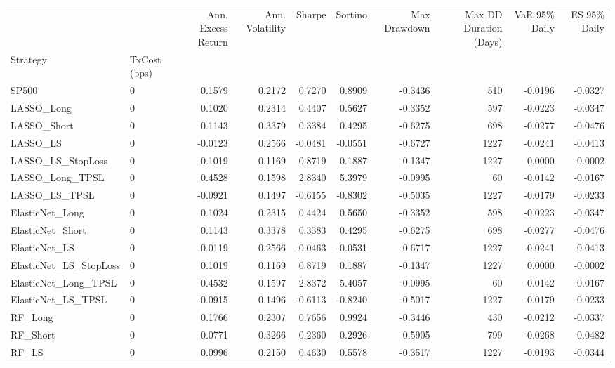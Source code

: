 \begin{tabular}{llrrrrrrrr}
\toprule
 &  & Ann. Excess Return & Ann. Volatility & Sharpe & Sortino & Max Drawdown & Max DD Duration (Days) & VaR 95\% Daily & ES 95\% Daily \\
Strategy & TxCost (bps) &  &  &  &  &  &  &  &  \\
\midrule
SP500 & 0 & 0.1579 & 0.2172 & 0.7270 & 0.8909 & -0.3436 & 510 & -0.0196 & -0.0327 \\
\cline{1-10}
LASSO\_Long & 0 & 0.1020 & 0.2314 & 0.4407 & 0.5627 & -0.3352 & 597 & -0.0223 & -0.0347 \\
\cline{1-10}
LASSO\_Short & 0 & 0.1143 & 0.3379 & 0.3384 & 0.4295 & -0.6275 & 698 & -0.0277 & -0.0476 \\
\cline{1-10}
LASSO\_LS & 0 & -0.0123 & 0.2566 & -0.0481 & -0.0551 & -0.6727 & 1227 & -0.0241 & -0.0413 \\
\cline{1-10}
LASSO\_LS\_StopLoss & 0 & 0.1019 & 0.1169 & 0.8719 & 0.1887 & -0.1347 & 1227 & 0.0000 & -0.0002 \\
\cline{1-10}
LASSO\_Long\_TPSL & 0 & 0.4528 & 0.1598 & 2.8340 & 5.3979 & -0.0995 & 60 & -0.0142 & -0.0167 \\
\cline{1-10}
LASSO\_LS\_TPSL & 0 & -0.0921 & 0.1497 & -0.6155 & -0.8302 & -0.5035 & 1227 & -0.0179 & -0.0233 \\
\cline{1-10}
ElasticNet\_Long & 0 & 0.1024 & 0.2315 & 0.4424 & 0.5650 & -0.3352 & 598 & -0.0223 & -0.0347 \\
\cline{1-10}
ElasticNet\_Short & 0 & 0.1143 & 0.3378 & 0.3383 & 0.4295 & -0.6275 & 698 & -0.0277 & -0.0476 \\
\cline{1-10}
ElasticNet\_LS & 0 & -0.0119 & 0.2566 & -0.0463 & -0.0531 & -0.6717 & 1227 & -0.0241 & -0.0413 \\
\cline{1-10}
ElasticNet\_LS\_StopLoss & 0 & 0.1019 & 0.1169 & 0.8719 & 0.1887 & -0.1347 & 1227 & 0.0000 & -0.0002 \\
\cline{1-10}
ElasticNet\_Long\_TPSL & 0 & 0.4532 & 0.1597 & 2.8372 & 5.4057 & -0.0995 & 60 & -0.0142 & -0.0167 \\
\cline{1-10}
ElasticNet\_LS\_TPSL & 0 & -0.0915 & 0.1496 & -0.6113 & -0.8240 & -0.5017 & 1227 & -0.0179 & -0.0233 \\
\cline{1-10}
RF\_Long & 0 & 0.1766 & 0.2307 & 0.7656 & 0.9924 & -0.3446 & 430 & -0.0212 & -0.0337 \\
\cline{1-10}
RF\_Short & 0 & 0.0771 & 0.3266 & 0.2360 & 0.2926 & -0.5905 & 799 & -0.0268 & -0.0482 \\
\cline{1-10}
RF\_LS & 0 & 0.0996 & 0.2150 & 0.4630 & 0.5578 & -0.3517 & 1227 & -0.0193 & -0.0344 \\

\end{tabular}
